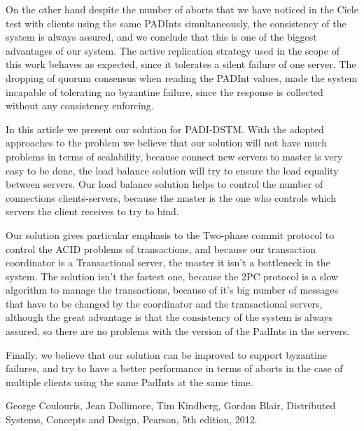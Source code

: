 \documentclass[times, 10pt,twocolumn]{article}
\begin{document}
On the other hand despite the number of aborts that we have noticed in the Cicle test with clients using the same PADInts simultaneously, the consistency of the system is always assured, and we conclude that this is one of the biggest advantages of our system.
The active replication strategy used in the scope of this work behaves as expected, since it tolerates a silent failure of one server.
The dropping of quorum consensus when reading the PADInt values, made the system incapable of tolerating no byzantine failure, since the response is collected without any consistency enforcing.


In this article we present our solution for PADI-DSTM. With the adopted approaches to the problem we believe that our solution will not have much problems in terms of scalability, because connect new servers to master is very easy to be done, the load balance solution will try to ensure the load equality between servers. Our load balance solution helps to control the number of connections clients-servers, because the master is the one who controls which servers the client receives to try to bind.

Our solution gives particular emphasis to the Two-phase commit protocol to control the ACID problems of transactions, and because our transaction coordinator is a Transactional server, the master it isn't a bottleneck in the system. The solution isn't the fastest one, because the 2PC protocol is a slow algorithm to manage the transactions, because of it's big number of messages that have to be changed by the coordinator and the transactional servers, although the great advantage is that the consistency of the system is always assured, so there are no problems with the version of the PadInts in the servers. 

Finally, we believe that our solution can be improved to support byzantine failures, and try to have a better performance in terms of aborts in the case of multiple clients using the same PadInts at the same time.





\begin{thebibliography}{9}
 
George Coulouris, Jean Dollimore, Tim Kindberg, Gordon Blair,
   Distributed Systems, Concepts and Design, 
   Pearson,
   5th edition,
   2012.

\end{thebibliography}
\end{document}
